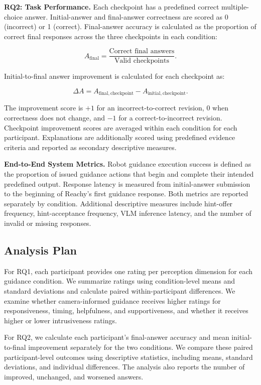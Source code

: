 \documentclass[conference]{IEEEtran}
\begin{document}
\noindent\textbf{RQ2: Task Performance.}
Each checkpoint has a predefined correct multiple-choice answer. Initial-answer and final-answer correctness are scored as 0 (incorrect) or 1 (correct). Final-answer accuracy is calculated as the proportion of correct final responses across the three checkpoints in each condition:

\begin{equation}
A_{\mathrm{final}} =
\frac{\text{Correct final answers}}{\text{Valid checkpoints}}.
\end{equation}

Initial-to-final answer improvement is calculated for each checkpoint as:

\begin{equation}
\Delta A =
A_{\mathrm{final,checkpoint}} -
A_{\mathrm{initial,checkpoint}}.
\end{equation}

The improvement score is $+1$ for an incorrect-to-correct revision, $0$ when correctness does not change, and $-1$ for a correct-to-incorrect revision. Checkpoint improvement scores are averaged within each condition for each participant. Explanations are additionally scored using predefined evidence criteria and reported as secondary descriptive measures.

\noindent\textbf{End-to-End System Metrics.}
Robot guidance execution success is defined as the proportion of issued guidance actions that begin and complete their intended predefined output. Response latency is measured from initial-answer submission to the beginning of Reachy's first guidance response. Both metrics are reported separately by condition. Additional descriptive measures include hint-offer frequency, hint-acceptance frequency, VLM inference latency, and the number of invalid or missing responses.

\subsection{Analysis Plan}

For RQ1, each participant provides one rating per perception dimension for each guidance condition. We summarize ratings using condition-level means and standard deviations and calculate paired within-participant differences. We examine whether camera-informed guidance receives higher ratings for responsiveness, timing, helpfulness, and supportiveness, and whether it receives higher or lower intrusiveness ratings.

For RQ2, we calculate each participant's final-answer accuracy and mean initial-to-final improvement separately for the two conditions. We compare these paired participant-level outcomes using descriptive statistics, including means, standard deviations, and individual differences. The analysis also reports the number of improved, unchanged, and worsened answers.
\end{document}
